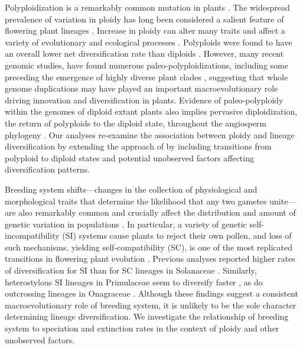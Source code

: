 Polyploidization is a remarkably common mutation in plants \citep{husband_2013, zenilferguson_2017}.
The widespread prevalence of variation in ploidy has long been considered a salient feature of flowering plant lineages \citep{stebbins1938}. 
Increase in ploidy can alter many traits and affect a variety of evolutionary and ecological processes \citep{ramsey_2002, sessa_2019}.
Polyploids were  found to have an overall lower net diversification rate than diploids \citep{mayrose_2011, mayrose_2015}. 
However, many recent genomic studies,  have found numerous paleo-polyploidizations, including some preceding the emergence of highly diverse plant clades \citep{soltis_2014, landis_2018}, suggesting that whole genome duplications may have played an important macroevolutionary role driving innovation and diversification in plants. 
Evidence of paleo-polyploidy within the genomes of diploid extant plants also implies pervasive diploidization, the return of polyploids to the diploid state, throughout the angiosperm phylogeny \citep{soltis_2015, dodsworth_2015}.
Our analyses re-examine the association between ploidy and lineage diversification by extending the approach of \citet{mayrose_2011, mayrose_2015} by including transitions from polyploid to diploid states and potential unobserved factors affecting diversification patterns.

Breeding system shifts---changes in the collection of physiological and morphological traits that determine the likelihood that any two gametes unite---are also remarkably common and crucially affect the distribution and amount of genetic variation in populations \citep{barrett2013}. %
In particular, a variety of genetic self-incompatibility (SI) systems cause plants to reject their own pollen, and loss of such mechanisms, yielding self-compatibility (SC), is one of the most replicated transitions in flowering plant evolution \citep{stebbins1974, igic_2008}.
Previous analyses reported higher rates of diversification for SI than for SC lineages in Solanaceae \citep{goldberg_2010}. 
Similarly, heterostylous SI lineages in Primulaceae seem to diversify faster \citep{devos2014}, as do outcrossing lineages in Onagraceae \citep{freyman_2019}.
Although these findings suggest a consistent macroevolutionary role of breeding system, it is unlikely to be the sole character determining lineage diversification.
We investigate the relationship of breeding system to speciation and extinction rates in the context of ploidy and other unobserved factors.

